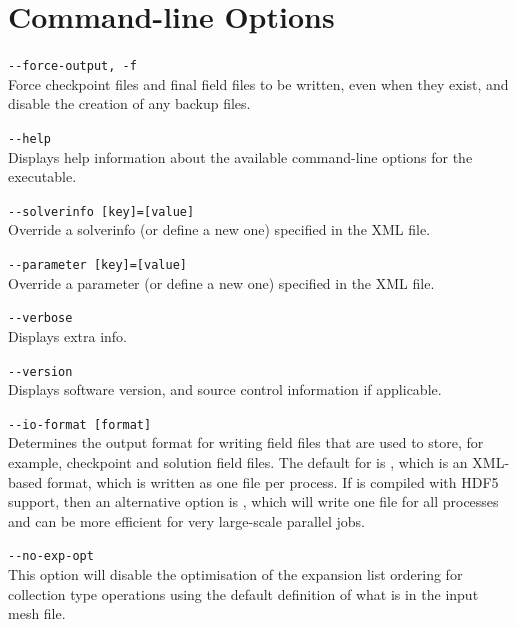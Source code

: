 \chapter{Command-line Options}
\label{command_line}
\lstinline[style=BashInputStyle]{--force-output, -f}\\
\hangindent=1.5cm
Force checkpoint files and final field files to be written, even when they exist, and disable the creation of any backup files.


\lstinline[style=BashInputStyle]{--help}\\
\hangindent=1.5cm
Displays help information about the available command-line options for the executable.

\lstinline[style=BashInputStyle]{--solverinfo [key]=[value]}\\
\hangindent=1.5cm
Override a solverinfo (or define a new one) specified in the XML file.

\lstinline[style=BashInputStyle]{--parameter [key]=[value]}\\
\hangindent=1.5cm
Override a parameter (or define a new one) specified in the XML file.

\lstinline[style=BashInputStyle]{--verbose}\\
\hangindent=1.5cm
Displays extra info.

\lstinline[style=BashInputStyle]{--version}\\
\hangindent=1.5cm
Displays software version, and source control information if applicable.


\lstinline[style=BashInputStyle]{--io-format [format]}\\
\hangindent=1.5cm Determines the output format for writing \nekpp field files
that are used to store, for example, checkpoint and solution field files. The
default for  is , which is an XML-based format, which
is written as one file per process. If \nekpp is compiled with HDF5 support,
then an alternative option is , which will write one file for all
processes and can be more efficient for very large-scale parallel jobs.

\lstinline[style=BashInputStyle]{--no-exp-opt}\\
\hangindent=1.5cm
This option will disable the optimisation of the expansion list ordering for collection type operations using the default definition of what is in the input mesh file. 

